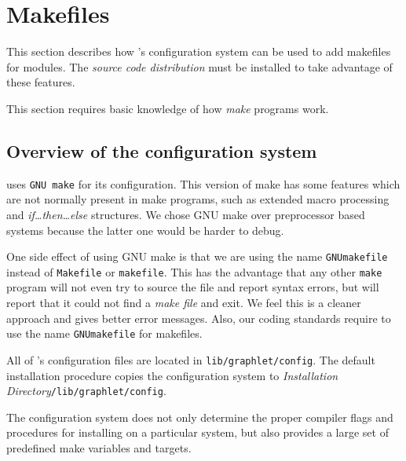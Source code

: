 \documentclass[twoside,fleqn]{report}
\begin{document}
%
%

\chapter{Makefiles}
\label{c:Makefiles}

This section describes how \Graphlet{}'s configuration system can be 
used to add makefiles for modules.  The \emph{source code 
distribution} must be installed to take advantage of these features.

\begin{skills}
  This section requires basic knowledge of how \emph{make} programs 
  work.
\end{skills}


%
%

\section{Overview of the configuration system}

\Graphlet{} uses \texttt{GNU make} for its configuration.  This 
version of make has some features which are not normally present in 
make programs, such as extended macro processing and 
\emph{if\ldots{}then\ldots{}else} structures.  We chose GNU make over 
preprocessor based systems because the latter one would be harder to 
debug.

One side effect of using GNU make is that we are using the name 
\texttt{GNUmakefile} instead of \texttt{Makefile} or 
\texttt{makefile}.  This has the advantage that any other 
\texttt{make} program will not even try to source the file and report 
syntax errors, but will report that it could not find a \emph{make
file} and exit.  We feel this is a cleaner approach and 
gives better error messages.  Also, our coding standards require to 
use the name \texttt{GNUmakefile} for makefiles.

All of \Graphlet{}'s configuration files are located in 
\texttt{lib/graphlet/config}.  The default installation procedure 
copies the configuration system to
\emph{\Graphlet{} Installation Directory}\texttt{/lib/graphlet/config}.

The configuration system does not only determine the proper compiler 
flags and procedures for installing \Graphlet{} on a particular 
system, but also provides a large set of predefined make variables and 
targets.
\end{document}
